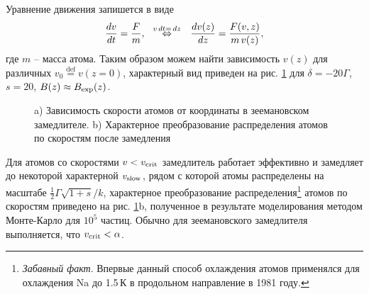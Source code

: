 Уравнение движения запишется в виде
\begin{equation*}
    \frac{d v}{d t} = \frac{F}{m},
    \hspace{0.25cm} \overset{v \, d t = \, d z}{\Leftrightarrow}  \hspace{0.25cm}
    \frac{d v(z)}{d z} = \frac{F(v, z)}{m \, v(z)},
\end{equation*}
где $m$ -- масса атома. Таким образом можем найти зависимость $v(z)$ для различных $v_0 \overset{\mathrm{def}}{=} v(z=0)$, характерный вид приведен на рис. \ref{fig:vZz} для $\delta = -20\Gamma$, $s=20$, $B(z) \approx B_{\textnormal{exp}}(z)$.
\begin{figure}[h]
    \centering
    \hspace{10 mm} 
    \vspace{-3mm}
    \caption{a) Зависимость скорости атомов от координаты в зеемановском замедлителе. b) Характерное преобразование распределения атомов по скоростям после замедления}
    \label{fig:vZz}
\end{figure}


Для атомов со скоростями $v < v_{\textnormal{crit}}$ замедлитель работает эффективно и замедляет до некоторой характерной $v_{\textnormal{slow}}$, рядом с которой атомы распределены на масштабе  $\frac{1}{2}\Gamma\sqrt{1+s} / k$, характерное преобразование распределения\footnote{
    \textit{Забавный факт}. Впервые данный способ охлаждения атомов применялся \cite{__1981} для охлаждения Na до 1.5\,К в продольном направление  в 1981 году.
}  атомов по скоростям приведено на рис. \ref{fig:vZz}b, полученное в результате моделирования методом Монте-Карло для $10^5$ частиц. Обычно для зеемановского замедлителя выполняется, что $v_{\textnormal{crit}} < \alpha$. 


